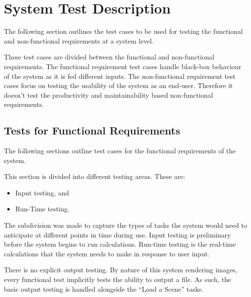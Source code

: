 \documentclass[12pt, titlepage]{article}
\begin{document}
\section{System Test Description}
The following section outlines the test cases to be used for testing the 
functional and non-functional requirements at a system level.

These test cases are divided between the functional and non-functional 
requirements. The functional requirement test cases handle black-box behaviour
of the system as it is fed different inputs. The non-functional requirement 
test cases focus on testing the usability of the system as an end-user. 
Therefore it doesn't test the productivity and maintainability based 
non-functional requirements.

\subsection{Tests for Functional Requirements}
The following sections outline test cases for the functional requirements of 
the system.

This section is divided into different testing areas. These are:

\begin{itemize}
	\item Input testing, and
	\item Run-Time testing.
\end{itemize}

The subdivision was made to capture the types of tasks the system would need to 
anticipate at different points in time during use. Input testing is preliminary 
before the system begins to run calculations. Run-time testing is the real-time 
calculations that the system needs to make in response to user input.

There is no explicit output testing. By nature of this system rendering images, 
every functional test implicitly tests the ability to output a file. As such, 
the basic output testing is handled alongside the ``Load a Scene'' tasks.

%
\end{document}
